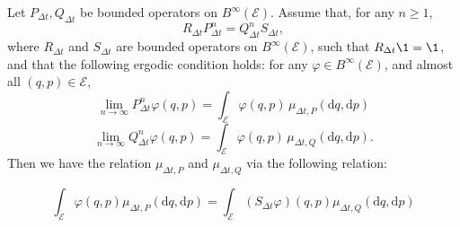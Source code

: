 \begin{lemma}
  Let $P_{\Delta t}, Q_{\Delta t}$ be bounded operators on $B^\infty(\mathcal E)$.
    Assume that, for any $n\geq 1$,
    $$ R_{\Delta t} P_{\Delta t}^n = Q_{\Delta t}^n S_{\Delta t},$$
    where $R_{\Delta t}$ and $S_{\Delta t}$ are bounded operators on $B^\infty (\mathcal E)$, such that $R_{\Delta t}\1=\1$, and that the following ergodic condition holds: for any $\varphi \in B^\infty(\mathcal E)$, and almost all $(q,p) \in \mathcal E$,
    $$ \underset{n\to\infty}\lim P_{\Delta t}^n\varphi (q,p) = \int_{\mathcal E} \varphi(q,p)\,\mu_{\Delta t,P}(\mathrm{d} q,\mathrm{d} p) $$
    $$ \underset{n\to\infty}\lim Q_{\Delta t}^n\varphi (q,p) = \int_{\mathcal E} \varphi(q,p)\,\mu_{\Delta t,Q}(\mathrm{d} q,\mathrm{d} p).$$
    Then  we have the relation $\mu_{\Delta t,P}$ and $\mu_{\Delta t,Q}$ via the following relation:

    \begin{equation*}
    \int_{\mathcal E} \varphi(q,p) \mu_{\Delta t,P}(\mathrm{d} q,\mathrm{d} p)=\int_{\mathcal E} \left(S_{\Delta t}\varphi\right)(q,p) \mu_{\Delta t,Q}(\mathrm{d} q,\mathrm{d} p)
    \end{equation*}
\end{lemma}

